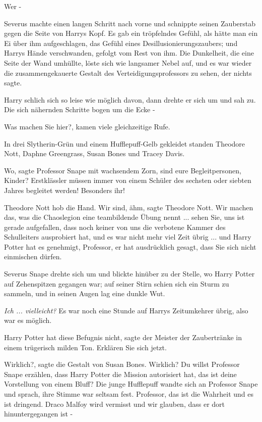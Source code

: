 \glqq{}Wer -\grqq{}

Severus machte einen langen Schritt nach vorne und schnippte seinen Zauberstab
gegen die Seite von Harrys Kopf. Es gab ein tröpfelndes Gefühl, als hätte man
ein Ei über ihm aufgeschlagen, das Gefühl eines Desillusionierungszaubers; und
Harrys Hände verschwanden, gefolgt vom Rest von ihm. Die Dunkelheit, die eine
Seite der Wand umhüllte, löste sich wie langsamer Nebel auf, und es war wieder
die zusammengekauerte Gestalt des Verteidigungsprofessors zu sehen, der nichts
sagte.

Harry schlich sich so leise wie möglich davon, dann drehte er sich um und sah
zu. Die sich nähernden Schritte bogen um die Ecke -

\glqq{}Was machen Sie hier?\grqq{}, kamen viele gleichzeitige Rufe.

In drei Slytherin-Grün und einem Hufflepuff-Gelb gekleidet standen Theodore
Nott, Daphne Greengrass, Susan Bones und Tracey Davis.

\glqq{}Wo\grqq{}, sagte Professor Snape mit wachsendem Zorn, \glqq{}sind eure
Begleitpersonen, Kinder? Erstklässler müssen immer von einem Schüler des
sechsten oder siebten Jahres begleitet werden! Besonders ihr!\grqq{}

Theodore Nott hob die Hand. \glqq{}Wir sind, ähm\grqq{}, sagte Theodore Nott.
\glqq{}Wir machen das, was die Chaoslegion eine teambildende Übung nennt ...
sehen Sie, uns ist gerade aufgefallen, dass noch keiner von uns die verbotene
Kammer des Schulleiters ausprobiert hat, und es war nicht mehr viel Zeit übrig
... und Harry Potter hat es genehmigt, Professor, er hat ausdrücklich gesagt,
dass Sie sich nicht einmischen dürfen.\grqq{}

Severus Snape drehte sich um und blickte hinüber zu der Stelle, wo Harry Potter
auf Zehenspitzen gegangen war; auf seiner Stirn schien sich ein Sturm zu
sammeln, und in seinen Augen lag eine dunkle Wut.

\emph{Ich ... vielleicht?}
Es war noch eine Stunde auf Harrys Zeitumkehrer übrig, also war es möglich.

\glqq{}Harry Potter hat diese Befugnis nicht\grqq{}, sagte der Meister der
Zaubertränke in einem trügerisch milden Ton. \glqq{}Erklären Sie sich jetzt.\grqq{}

\glqq{}Wirklich?\grqq{}, sagte die Gestalt von Susan Bones. \glqq{}Wirklich? Du
willst Professor Snape erzählen, dass Harry Potter die Mission autorisiert hat,
das ist deine Vorstellung von einem Bluff?\grqq{} Die junge Hufflepuff wandte
sich an Professor Snape und sprach, ihre Stimme war seltsam fest. \glqq{}
Professor, das ist die Wahrheit und es ist dringend. Draco Malfoy wird vermisst
und wir glauben, dass er dort hinuntergegangen ist -\grqq{}

